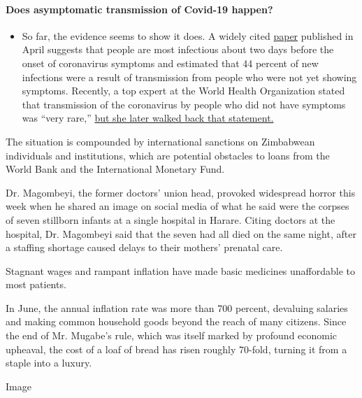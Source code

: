 \begin{itemize}
{  \paragraph{Does asymptomatic transmission of Covid-19
  happen?}\label{does-asymptomatic-transmission-of-covid-19-happen}}

  \begin{itemize}
  \tightlist
  \item
    So far, the evidence seems to show it does. A widely cited
    \href{https://www.nature.com/articles/s41591-020-0869-5}{paper}
    published in April suggests that people are most infectious about
    two days before the onset of coronavirus symptoms and estimated that
    44 percent of new infections were a result of transmission from
    people who were not yet showing symptoms. Recently, a top expert at
    the World Health Organization stated that transmission of the
    coronavirus by people who did not have symptoms was ``very rare,''
    \href{https://www.nytimes3xbfgragh.onion/2020/06/09/world/coronavirus-updates.html?action=click\&pgtype=Article\&state=default\&region=MAIN_CONTENT_3\&context=storylines_faq\#link-1f302e21}{but
    she later walked back that statement.}
  \end{itemize}
\end{itemize}

The situation is compounded by international sanctions on Zimbabwean
individuals and institutions, which are potential obstacles to loans
from the World Bank and the International Monetary Fund.

Dr. Magombeyi, the former doctors' union head, provoked widespread
horror this week when he shared an image on social media of what he said
were the corpses of seven stillborn infants at a single hospital in
Harare. Citing doctors at the hospital, Dr. Magombeyi said that the
seven had all died on the same night, after a staffing shortage caused
delays to their mothers' prenatal care.

Stagnant wages and rampant inflation have made basic medicines
unaffordable to most patients.

In June, the annual inflation rate was more than 700 percent, devaluing
salaries and making common household goods beyond the reach of many
citizens. Since the end of Mr. Mugabe's rule, which was itself marked by
profound economic upheaval, the cost of a loaf of bread has risen
roughly 70-fold, turning it from a staple into a luxury.

Image

